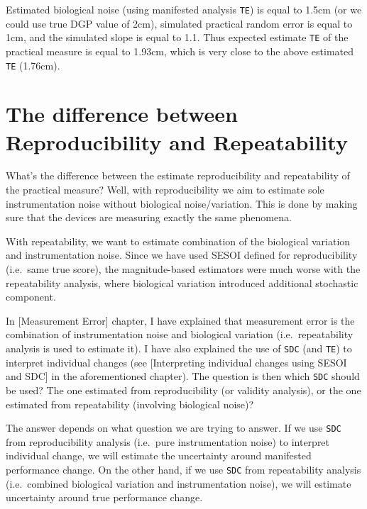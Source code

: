\documentclass[
]{book}
\begin{document}
Estimated biological noise (using manifested analysis \texttt{TE}) is equal to 1.5cm (or we could use true DGP value of 2cm), simulated practical random error is equal to 1cm, and the simulated slope is equal to 1.1. Thus expected estimate \texttt{TE} of the practical measure is equal to 1.93cm, which is very close to the above estimated \texttt{TE} (1.76cm).

\hypertarget{the-difference-between-reproducibility-and-repeatability}{%
\section{The difference between Reproducibility and Repeatability}\label{the-difference-between-reproducibility-and-repeatability}}

What's the difference between the estimate reproducibility and repeatability of the practical measure? Well, with reproducibility we aim to estimate sole instrumentation noise without biological noise/variation. This is done by making sure that the devices are measuring exactly the same phenomena.

With repeatability, we want to estimate combination of the biological variation and instrumentation noise. Since we have used SESOI defined for reproducibility (i.e.~same true score), the magnitude-based estimators were much worse with the repeatability analysis, where biological variation introduced additional stochastic component.

In {[}Measurement Error{]} chapter, I have explained that measurement error is the combination of instrumentation noise and biological variation (i.e.~repeatability analysis is used to estimate it). I have also explained the use of \texttt{SDC} (and \texttt{TE}) to interpret individual changes (see {[}Interpreting individual changes using SESOI and SDC{]} in the aforementioned chapter). The question is then which \texttt{SDC} should be used? The one estimated from reproducibility (or validity analysis), or the one estimated from repeatability (involving biological noise)?

The answer depends on what question we are trying to answer. If we use \texttt{SDC} from reproducibility analysis (i.e.~pure instrumentation noise) to interpret individual change, we will estimate the uncertainty around manifested performance change. On the other hand, if we use \texttt{SDC} from repeatability analysis (i.e.~combined biological variation and instrumentation noise), we will estimate uncertainty around true performance change.
\end{document}
